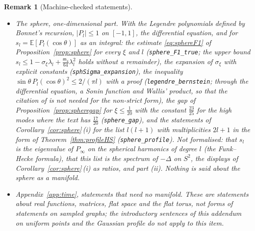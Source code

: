 \documentclass[11pt,a4paper]{article}
\theoremstyle{stmt}
\theoremstyle{defn}
\theoremstyle{rmk}
\newtheorem{remark}[theorem]{Remark}
\numberwithin{equation}{section}
\begin{document}
{\begin{remark}[Machine-checked statements]
\begin{itemize}
\item \emph{The sphere, one-dimensional part.} With the Legendre polynomials defined by Bonnet's recursion, $|P_l|\le1$ on $[-1,1]$, the differential equation, and for $s_l=\mathbb E[P_l(\cos\theta)]$ as an integral: the estimate \eqref{eq:sphereF1} of Proposition~\ref{prop:sphere} for every $\xi$ and $l$ (\texttt{sphere\_F1\_true}; the upper bound $s_l\le1-\sigma_\xi\lambda_l+\frac{\mathsf m_4}{64}\lambda_l^2$ holds without a remainder), the expansion of $\sigma_\xi$ with explicit constants (\texttt{sphSigma\_expansion}), the inequality $\sin\theta\,P_l(\cos\theta)^2\le2/(\pi l)$ with a proof (\texttt{legendre\_bernstein}; through the differential equation, a Sonin function and Wallis' product, so that the citation of \cite{Szego} is not needed for the non-strict form), the gap of Proposition~\ref{prop:spheregap} for $\xi\le\frac1{20}$ with the constant $\frac{23}{25}$ for the high modes where the text has $\frac{17}{20}$ (\texttt{sphere\_gap}), and the statements of Corollary~\ref{cor:sphere}\,(i) for the list $l(l+1)$ with multiplicities $2l+1$ in the form of Theorem~\ref{thm:profileHS} (\texttt{sphere\_profile}). Not formalised: that $s_l$ is the eigenvalue of $P_\infty$ on the spherical harmonics of degree $l$ (the Funk--Hecke formula), that this list is the spectrum of $-\Delta$ on $S^2$, the displays of Corollary~\ref{cor:sphere}\,(i) as ratios, and part (ii). Nothing is said about the sphere as a manifold.
\item \emph{Appendix~\ref{app:time}, statements that need no manifold.} These are statements about real functions, matrices, flat space and the flat torus, not forms of statements on sampled graphs; the introductory sentences of this addendum on uniform points and the Gaussian profile do not apply to this item.

\end{itemize}
\end{remark}}
\end{document}
